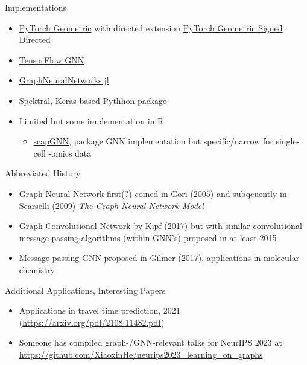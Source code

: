 \documentclass{beamer}
\begin{document}
\begin{frame}{Implementations}
    \begin{itemize}
        \item \href{https://pytorch-geometric.readthedocs.io/en/latest/}{PyTorch Geometric} with directed extension \href{https://github.com/SherylHYX/pytorch_geometric_signed_directed}{PyTorch Geometric Signed Directed}
        \item \href{https://github.com/tensorflow/gnn}{TensorFlow GNN} \cite{ferludin_tf-gnn_2023}
        \item \href{https://carlolucibello.github.io/GraphNeuralNetworks.jl/dev/}{GraphNeuralNetworks.jl}
        \item \href{https://graphneural.network/}{Spektral}, Keras-based Pythhon package 
        \item Limited but some implementation in R 
        \begin{itemize}
            \item \href{https://cran.r-project.org/web/packages/scapGNN/vignettes/vignette.html}{scapGNN}, package GNN implementation but specific/narrow for single-cell -omics data 
        \end{itemize}
    \end{itemize}
\end{frame}


\begin{frame}{Abbreviated History}
    \begin{itemize}
        \item Graph Neural Network first(?) coined in Gori (2005) \cite{gori_new_2005} and subqeuently in Scarselli (2009) {\it The Graph Neural Network Model} \cite{scarselli_graph_2009}
        \item Graph Convolutional Network by Kipf (2017) \cite{kipf_semi-supervised_2017} but with similar convolutional message-passing algorithms (within GNN's) proposed in at least 2015 \cite{duvenaud_convolutional_2015}
        \item Message passing GNN proposed in Gilmer (2017), applications in molecular chemistry \cite{gilmer_neural_2017} 
    \end{itemize}
\end{frame}

\begin{frame}[allowframebreaks]{Additional Applications, Interesting Papers}
    \begin{itemize}
        \item Applications in travel time prediction, 2021 (\url{https://arxiv.org/pdf/2108.11482.pdf})
        \item Someone has compiled graph-/GNN-relevant talks for NeurIPS 2023 at \url{https://github.com/XiaoxinHe/neurips2023_learning_on_graphs}
    \end{itemize}
\end{frame}
\end{document}
